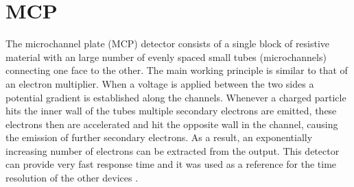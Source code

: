 \section{MCP}\label{sec:MCP_description}
The microchannel plate (MCP) detector consists of a single block of resistive material with an large number of evenly spaced small tubes (microchannels) connecting one face to the other. The main working principle is similar to that of an electron multiplier. When a voltage is applied between the two sides a potential gradient is established along the channels. Whenever a charged particle hits the inner wall of the tubes multiple secondary electrons are emitted, these electrons then are accelerated and hit the opposite wall in the channel, causing the emission of further secondary electrons. As a result, an exponentially increasing number of electrons can be extracted from the output. This detector can provide very fast response time and it was used as a reference for the time resolution of the other devices \cite{LADISLASWIZA1979587}.


